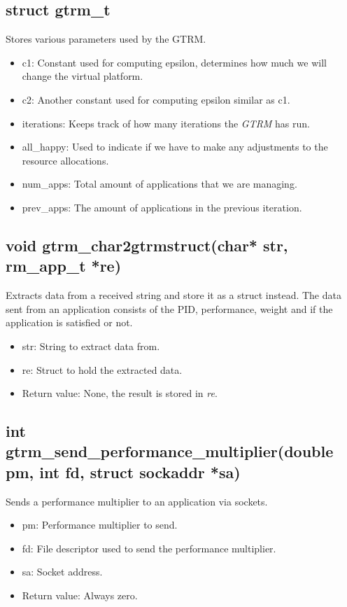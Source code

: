 \documentclass[nobiblatex]{LTHthesis}
\begin{document}
\subsection{struct gtrm\_t}
Stores various parameters used by the GTRM.
\begin{itemize}
\item c1: Constant used for computing epsilon, determines how much we will change the virtual platform.
\item c2: Another constant used for computing epsilon similar as c1.
\item iterations: Keeps track of how many iterations the \emph{GTRM} has run.
\item all\_happy: Used to indicate if we have to make any adjustments to the resource allocations.
\item num\_apps: Total amount of applications that we are managing.
\item prev\_apps: The amount of applications in the previous iteration.
\end{itemize}

\subsection{void gtrm\_char2gtrmstruct(char* str, rm\_app\_t *re)}
Extracts data from a received string and store it as a struct instead. The data sent from an application consists of the PID, performance, weight and if the application is satisfied or not.
\begin{itemize} 
\item str: String to extract data from.
\item re: Struct to hold the extracted data.
\item Return value: None, the result is stored in \emph{re}.
\end{itemize}

\subsection{int gtrm\_send\_performance\_multiplier(double pm, int fd, struct sockaddr *sa)}
Sends a performance multiplier to an application via sockets.
\begin{itemize} 
\item pm: Performance multiplier to send.
\item fd: File descriptor used to send the performance multiplier.
\item sa: Socket address.
\item Return value: Always zero.
\end{itemize}
\end{document}

